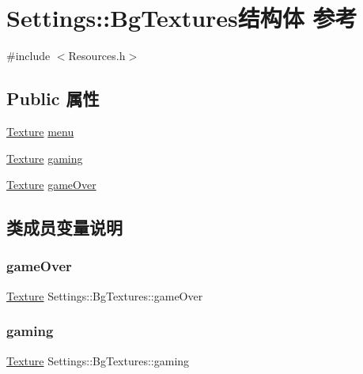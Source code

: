\hypertarget{struct_settings_1_1_bg_textures}{}\section{Settings\+:\+:Bg\+Textures结构体 参考}
\label{struct_settings_1_1_bg_textures}


{\ttfamily \#include $<$Resources.\+h$>$}

\subsection*{Public 属性}
\begin{DoxyCompactItemize}
\item 
\hyperlink{struct_texture}{Texture} \hyperlink{struct_settings_1_1_bg_textures_ab2f017635aaeb1ee5dbb544f2a053b30}{menu}
\item 
\hyperlink{struct_texture}{Texture} \hyperlink{struct_settings_1_1_bg_textures_a18b57a3e110a025b0b44ba3d838efc88}{gaming}
\item 
\hyperlink{struct_texture}{Texture} \hyperlink{struct_settings_1_1_bg_textures_ab00469bb4e54982cfffe1b7f48f593f2}{game\+Over}
\end{DoxyCompactItemize}


\subsection{类成员变量说明}
\mbox{\label{struct_settings_1_1_bg_textures_ab00469bb4e54982cfffe1b7f48f593f2}} 
\subsubsection{\texorpdfstring{game\+Over}{gameOver}}
{\footnotesize\ttfamily \hyperlink{struct_texture}{Texture} Settings\+::\+Bg\+Textures\+::game\+Over}

\mbox{\label{struct_settings_1_1_bg_textures_a18b57a3e110a025b0b44ba3d838efc88}} 
\subsubsection{\texorpdfstring{gaming}{gaming}}
{\footnotesize\ttfamily \hyperlink{struct_texture}{Texture} Settings\+::\+Bg\+Textures\+::gaming}

